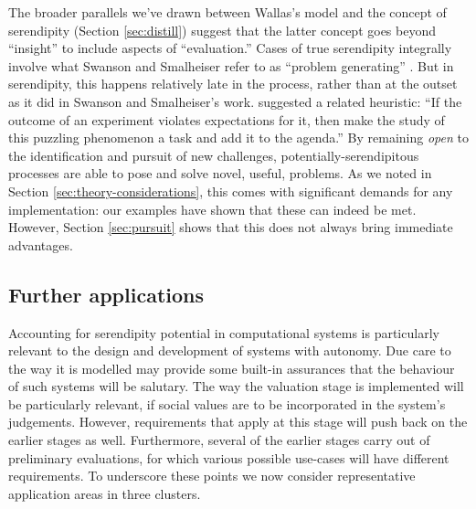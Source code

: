 The broader parallels we've drawn between Wallas's model
and the concept of serendipity
(Section \ref{sec:distill}) suggest that the latter concept goes beyond
``insight'' to include aspects of ``evaluation.''
Cases of true serendipity integrally involve what Swanson and Smalheiser refer to as ``problem generating''
\cite[p~.186]{swanson1997interactive}.  But in
serendipity, this happens relatively late in the process, rather
than at the outset as it did in Swanson and Smalheiser's work.  \citet[p.~153]{kulkarni1988processes} suggested a
related heuristic: ``If the outcome of an experiment violates
expectations for it, then make the study of this puzzling phenomenon a
task and add it to the agenda.''
By remaining \emph{open} \cite{jurvsivc2012cross} to the
identification and pursuit of new challenges,
potentially-serendipitous processes are able to pose and solve novel, useful,
problems.
As we noted in Section \ref{sec:theory-considerations}, this comes
with significant demands for any implementation: our examples have
shown that these can indeed be met.  However, Section \ref{sec:pursuit}
shows that this does not always bring immediate advantages.


\subsection{Further applications} \label{sec:applications}

Accounting for serendipity potential in computational systems is
particularly relevant to the design and development of systems with
autonomy.  Due care to the way it is modelled may provide some
built-in assurances that the behaviour of such systems will be
salutary.  The way the valuation stage is implemented will be
particularly relevant, if social values are to be incorporated in the
system's judgements.  However, requirements that apply at this stage
will push back on the earlier stages as well.  Furthermore, several of
the earlier stages carry out of preliminary evaluations, for which
various possible use-cases will have different requirements.  To
underscore these points we now consider representative application
areas in three clusters.

